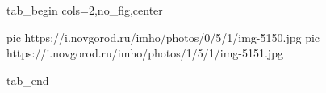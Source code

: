  
 
 
 
 


\ifcmt
  tab_begin cols=2,no_fig,center

     pic https://i.novgorod.ru/imho/photos/0/5/1/img-5150.jpg
		 pic https://i.novgorod.ru/imho/photos/1/5/1/img-5151.jpg

  tab_end
\fi
